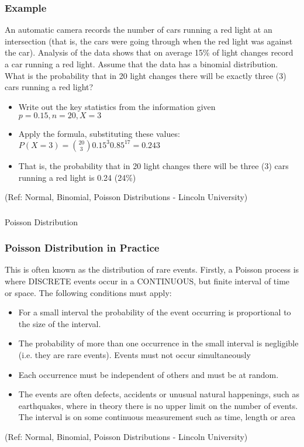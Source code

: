 \begin{frame}
\frametitle{Example }

An automatic camera records the number of cars running a red light at an
intersection (that is, the cars were going through when the red light was against the
car). Analysis of the data shows that on average 15\% of light changes record a car
running a red light. Assume that the data has a binomial distribution. What is the
probability that in 20 light changes there will be exactly three (3) cars running a red
light?

\begin{itemize}
\item Write out the key statistics from the information given $p =0.15, n = 20, X = 3$
\item Apply the formula, substituting these values: $P(X=3) = {20 \choose 3} 0.15^3 0.85^{17} = 0.243$
\item That is, the probability that in 20 light changes there will be three (3) cars running a
red light is 0.24 (24\%)
\end{itemize}

{\tiny (Ref: Normal, Binomial, Poisson Distributions -  Lincoln University)}
\end{frame}


\begin{frame}[fragile]\frametitle{}
\begin{center}
{\Large Poisson Distribution}
\end{center}
\end{frame}

\begin{frame}
\frametitle{Poisson Distribution in Practice}

This is often known as the distribution of rare events. Firstly, a Poisson process is
where DISCRETE events occur in a CONTINUOUS, but finite interval of time or
space. The following conditions must apply:


\begin{itemize}
\item For a small interval the probability of the event occurring is proportional to the size of the interval.
\item The probability of more than one occurrence in the small interval is negligible (i.e. they are rare events). Events must not occur simultaneously
\item Each occurrence must be independent of others and must be at random.
\item  The events are often defects, accidents or unusual natural happenings, such as
earthquakes, where in theory there is no upper limit on the number of events.
The interval is on some continuous measurement such as time, length or area
\end{itemize}


{\tiny (Ref: Normal, Binomial, Poisson Distributions -  Lincoln University)}
\end{frame}



